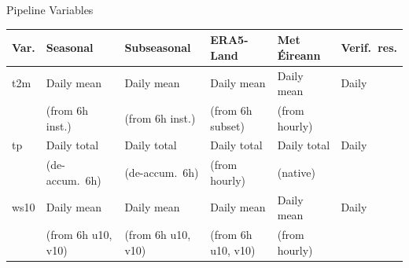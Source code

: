 \documentclass[aspectratio=169]{beamer}
\begin{document}
%
\begin{frame}{Pipeline Variables}

    \centering

    \footnotesize
    \renewcommand{\arraystretch}{1.4}
    \begin{tabular}{l l l l l l}
    \toprule
    \textbf{Var.} & \textbf{Seasonal} & \textbf{Subseasonal} & \textbf{ERA5-Land} & \textbf{Met \'Eireann} & \textbf{Verif.\ res.} \\
    \midrule
    t2m  & Daily mean      & Daily mean      & Daily mean        & Daily mean    & Daily \\
         & (from 6h inst.) & (from 6h inst.) & (from 6h subset)  & (from hourly) & \\[0.4em]
    tp   & Daily total     & Daily total     & Daily total       & Daily total   & Daily \\
         & (de-accum.\ 6h) & (de-accum.\ 6h) & (from hourly)    & (native)      & \\[0.4em]
    ws10 & Daily mean      & Daily mean      & Daily mean        & Daily mean    & Daily \\
         & (from 6h u10, v10) & (from 6h u10, v10) & (from 6h u10, v10) & (from hourly) & \\
    \bottomrule
    \end{tabular}

    \vspace{1em}

\end{frame}
\end{document}
